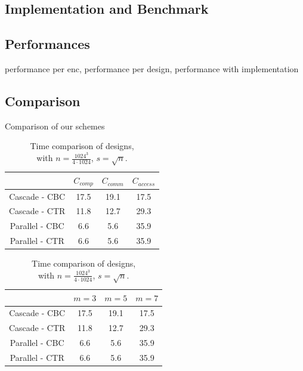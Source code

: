 \documentclass[USenglish,oneside,twocolumn]{article}
\begin{document}
\subsection{Implementation and Benchmark}\label{Implementation}
\subsection{Performances}\label{Performance}
performance per enc, performance per design, performance with implementation
\subsection{Comparison}\label{Comparison}
Comparison of our schemes

\begin{table}
\begin{minipage}[t][][b]{.475\textwidth}
\vspace{0pt}
\centering
\begin{tabular}{*4c}
\toprule
    				& $C_{comp}$  	 & $C_{comm}$		& $C_{access}$\\
\midrule
Cascade - CBC   &  17.5 		& 19.1   		& 17.5  \\
Cascade - CTR   &  11.8 		& 12.7   		& 29.3  \\
Parallel - CBC  &  6.6  		&  5.6   		& 35.9  \\
Parallel - CTR  &  6.6  		&  5.6   		& 35.9  \\
\bottomrule
\end{tabular}
\centering
\caption{Cost comparison of designs.}
\end{minipage}
\hfill
\begin{minipage}[t][][b]{.475\textwidth}
\vspace{0pt}
\begin{tabular}{*4c}
\toprule
    				& $m=3$  	 & $m=5$		& $m=7$\\
\midrule
Cascade - CBC   &  17.5 		& 19.1   		& 17.5  \\
Cascade - CTR   &  11.8 		& 12.7   		& 29.3  \\
Parallel - CBC  &  6.6  		&  5.6   		& 35.9  \\
Parallel - CTR  &  6.6  		&  5.6   		& 35.9  \\
\bottomrule
\end{tabular}
\centering
\caption{Time comparison of designs,\\with $n=\frac{1024^3}{4\cdot 1024}$, $s=\sqrt n$.}
\end{minipage}
\end{table}
\end{document}
